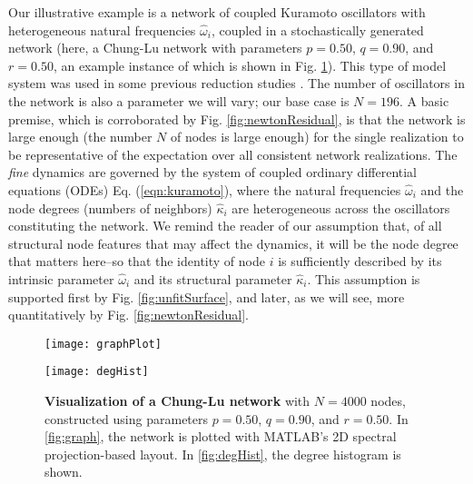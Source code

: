 \documentclass[numbers]{frontiersSCNS}
\newcommand{\degree}{\kappa}
\newcommand{\figRef}[1]{Fig. \ref{fig:#1}}
\newcommand{\eqnRef}[1]{Eq. (\ref{eqn:#1})}
\newcommand{\wordDefn}[1]{\emph{#1}}
\newcommand{\chungLuPVal}{0.50}
\newcommand{\chungLuQVal}{0.90}
\newcommand{\chungLuRVal}{0.50}
\newcommand{\baseNVal}{196}
\newcommand{\graphPlotNval}{4000}
\begin{document}
Our illustrative example is a network of coupled Kuramoto oscillators with
heterogeneous natural frequencies $\hat \omega_i$,
coupled in a stochastically generated network (here, a Chung-Lu network \cite{Chung2002}
with parameters $p=\chungLuPVal$, $q=\chungLuQVal$, and $r=\chungLuRVal$,
an example instance of which is shown in \figRef{degreeHistogram}).
%
This type of model system was used
in some previous reduction studies \cite{Moon2006,Rajendran2011}.
%
The number of oscillators in the network is also a parameter we will vary;
our base case is $N=\baseNVal$.
%
A basic premise, which is corroborated by \figRef{newtonResidual},
is that the network is large enough (the number $N$ of nodes
is large enough) for the single realization to be representative of the expectation
over all consistent network realizations.
%
The \wordDefn{fine} dynamics are governed
by the system of coupled ordinary differential equations (ODEs) \eqnRef{kuramoto},
where the natural frequencies $\hat\omega_i$ and the node degrees (numbers of neighbors)
$\hat\degree_i$
are heterogeneous across the oscillators constituting the network.
%
We remind the reader of our assumption that,
of all structural node features that may affect the dynamics,
it will be the node degree that matters here--so that the identity of node $i$
is sufficiently described by its intrinsic parameter $\hat\omega_i$
and its structural parameter $\hat\degree_i$.
%
This assumption is supported first by \figRef{unfitSurface},
and later, as we will see, more quantitatively by \figRef{newtonResidual}.


%
\setcounter{subfigure}{0}\begin{figure}[ht]
\centering
%
\begin{minipage}[b]{.45\linewidth}
    \centering
    \texttt{[image: graphPlot]}\subcaption{}\label{fig:graph}
\end{minipage}
\begin{minipage}[b]{.45\linewidth}
    \centering
    \texttt{[image: degHist]}\subcaption{}\label{fig:degHist}
\end{minipage}
\caption{
    \textbf{Visualization of a Chung-Lu network} \cite{Chung2002} with $N=\graphPlotNval$ nodes,
    constructed using parameters $p=\chungLuPVal$, $q=\chungLuQVal$, and $r=\chungLuRVal$.
    In \ref{fig:graph}, the network is plotted with MATLAB's 2D spectral projection-based layout.
    In \ref{fig:degHist}, the degree histogram is shown.
}
\label{fig:degreeHistogram}
\end{figure}
%
\end{document}
